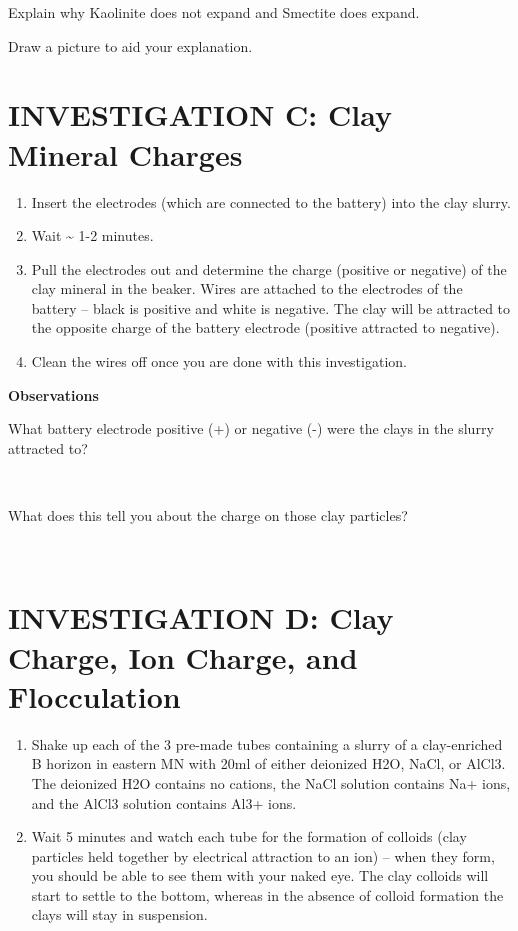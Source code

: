 \documentclass[
  letterpaper,
  twocolumn,
  portrait]{scrbook}
\providecommand{\tightlist}{%
  \setlength{\itemsep}{0pt}\setlength{\parskip}{0pt}}\usepackage{longtable,booktabs,array}
\begin{document}
Explain why Kaolinite does not expand and Smectite does expand.

Draw a picture to aid your explanation.

\hypertarget{investigation-c-clay-mineral-charges}{%
\section{INVESTIGATION C: Clay Mineral
Charges}\label{investigation-c-clay-mineral-charges}}

\begin{enumerate}
\def\labelenumi{\arabic{enumi}.}
\tightlist
\item
  Insert the electrodes (which are connected to the battery) into the
  clay slurry.
\item
  Wait \textasciitilde{} 1-2 minutes.
\item
  Pull the electrodes out and determine the charge (positive or
  negative) of the clay mineral in the beaker. Wires are attached to the
  electrodes of the battery -- black is positive and white is negative.
  The clay will be attracted to the opposite charge of the battery
  electrode (positive attracted to negative).
\item
  Clean the wires off once you are done with this investigation.
\end{enumerate}

\textbf{Observations}

What battery electrode positive (+) or negative (-) were the clays in
the slurry attracted to?

~ ~ ~

What does this tell you about the charge on those clay particles?

~ ~ ~

\hypertarget{investigation-d-clay-charge-ion-charge-and-flocculation}{%
\section{INVESTIGATION D: Clay Charge, Ion Charge, and
Flocculation}\label{investigation-d-clay-charge-ion-charge-and-flocculation}}

\begin{enumerate}
\def\labelenumi{\arabic{enumi}.}
\tightlist
\item
  Shake up each of the 3 pre-made tubes containing a slurry of a
  clay-enriched B horizon in eastern MN with 20ml of either deionized
  H2O, NaCl, or AlCl3. The deionized H2O contains no cations, the NaCl
  solution contains Na+ ions, and the AlCl3 solution contains Al3+ ions.
\item
  Wait 5 minutes and watch each tube for the formation of colloids (clay
  particles held together by electrical attraction to an ion) -- when
  they form, you should be able to see them with your naked eye. The
  clay colloids will start to settle to the bottom, whereas in the
  absence of colloid formation the clays will stay in suspension.
\end{enumerate}
\end{document}
